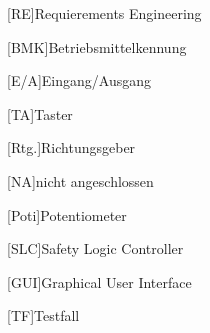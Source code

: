 \documentclass[12pt, a4paper, twoside]{article} %
\begin{document}
\begin{acronym}[RE]
	[RE]{Requierements Engineering}
\end{acronym}
\begin{acronym}[BMK]
	[BMK]{Betriebsmittelkennung}
\end{acronym}
\begin{acronym}[EA]
	[E/A]{Eingang/Ausgang}
\end{acronym}
\begin{acronym}[TA]
	[TA]{Taster}
\end{acronym}
\begin{acronym}[RTG]
	[Rtg.]{Richtungsgeber}
\end{acronym}
\begin{acronym}[NA]
	[NA]{nicht angeschlossen}
\end{acronym}
\begin{acronym}[Poti]
	[Poti]{Potentiometer}
\end{acronym}
\begin{acronym}[SLC]
	[SLC]{Safety Logic Controller}
\end{acronym}
\begin{acronym}[GUI]
	[GUI]{Graphical User Interface}
\end{acronym}
\begin{acronym}[TF]
	[TF]{Testfall}
\end{acronym}
\clearpage

\pagestyle{fancy}



\newpage




\newpage


\newpage




\newpage


\newpage

\end{document}

